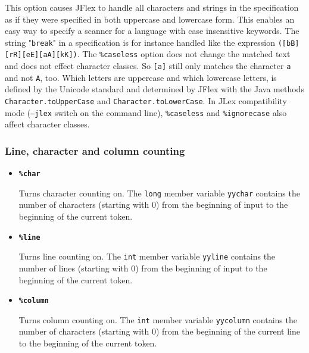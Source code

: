 \documentclass[11pt]{scrartcl}
\begin{document}
\begin{itemize}
This option causes JFlex to handle all characters and strings in the
specification as if they were specified in both uppercase and lowercase form.
This enables an easy way to specify a scanner for a language with case
insensitive keywords. The string "\texttt{break}" in a specification is for
instance handled like the expression \texttt{([bB][rR][eE][aA][kK])}. The
\texttt{\%caseless} option does not change the matched text and does not
effect character classes. So \texttt{[a]} still only matches the character
\texttt{a} and not \texttt{A}, too. Which letters are uppercase and which
lowercase letters, is defined by the Unicode standard and determined by JFlex
with the Java methods \texttt{Character.toUpperCase} and
\texttt{Character.toLowerCase}. In JLex compatibility mode (\texttt{--jlex}
switch on the command line), \texttt{\%caseless} and \texttt{\%ignorecase}
also affect character classes.

 \end{itemize}
\subsubsection{Line, character and column counting\label{Counting}}
\begin{itemize}
\item
{\bf \texttt{\%char}}

Turns character counting on. The \texttt{long} member variable \texttt{yychar}
contains the number of characters (starting with 0) from the beginning
of input to the beginning of the current token.
 
\item
{\bf \texttt{\%line}}

Turns line counting on. The \texttt{int} member variable \texttt{yyline}
contains the number of lines (starting with 0) from the beginning of input
to the beginning of the current token.
 
\item
{\bf \texttt{\%column}}

Turns column counting on. The \texttt{int} member variable \texttt{yycolumn}
contains the number of characters (starting with 0) from the beginning
of the current line to the beginning of the current token.

 \end{itemize}
\end{document}
